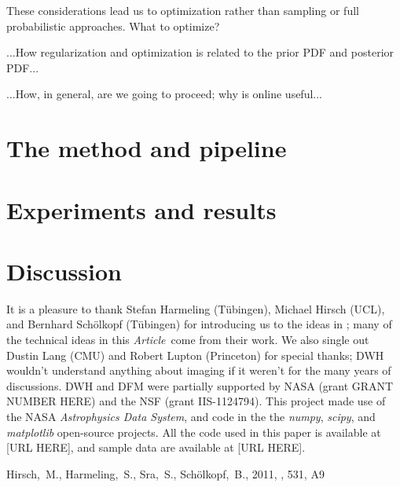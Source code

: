 \documentclass[12pt,preprint]{aastex}
\newcommand{\foreign}[1]{\textit{#1}}
\newcommand{\etal}{\foreign{et~al.}}
\newcommand{\project}[1]{\textsl{#1}}
\newcommand{\documentname}{\textsl{Article}}
\begin{document}
These considerations lead us to optimization rather than sampling or
full probabilistic approaches.  What to optimize?

...How regularization and optimization is related to the prior PDF and posterior PDF...

...How, in general, are we going to proceed; why is online useful...

\section{The method and pipeline}

\section{Experiments and results}

\section{Discussion}

\acknowledgements It is a pleasure to thank Stefan Harmeling
(T\"ubingen), Michael Hirsch (UCL), and Bernhard Sch\"olkopf
(T\"ubingen) for introducing us to the ideas in \citet{hirsch}; many
of the technical ideas in this \documentname\ come from their work.
We also single out Dustin Lang (CMU) and Robert Lupton (Princeton) for
special thanks; DWH wouldn't understand anything about imaging if it
weren't for the many years of discussions.  DWH and DFM were partially
supported by NASA (grant GRANT NUMBER HERE) and the NSF (grant
IIS-1124794).  This project made use of the NASA \project{Astrophysics
  Data System}, and code in the the \project{numpy}, \project{scipy},
and \project{matplotlib} open-source projects.  All the code used in
this paper is available at [URL HERE], and sample data are available
at [URL HERE].

\begin{thebibliography}{70}
\bibitem[Hirsch \etal(2011)]{hirsch}
Hirsch,~M., Harmeling,~S., Sra,~S., Sch\"olkopf,~B., 2011, \aap, 531, A9
\end{thebibliography}
\end{document}
